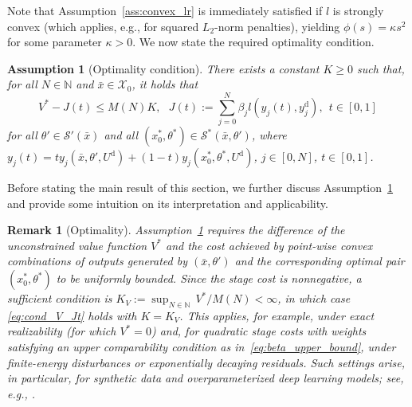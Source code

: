 \documentclass[a4paper,fleqn]{cas-dc}
\newtheorem{ass}{Assumption}
\newtheorem{rem}{Remark}
\begin{document}
Note that Assumption~\ref{ass:convex_lr} is immediately satisfied if $l$ is strongly convex (which applies, e.g., for squared $L_2$-norm penalties), yielding $\phi(s)={\kappa}s^2$ for some parameter $\kappa>0$.
We now state the required optimality condition.

\begin{ass}[Optimality condition]\label{ass:optimality}
	There exists a constant $K\geq0$ such that, for all $N\in\mathbb{N}$ and $\bar{x}\in\mathcal{X}_0$, it holds that
	\begin{equation}\label{eq:cond_V_Jt}
		V^* - J(t) \leq M(N)K, \ \ \ J(t) := \sum_{j=0}^N\beta_jl(y_j(t),y^\mathrm{d}_j), \ \ t\in[0,1]
	\end{equation}
	for all $\theta'\in\mathcal{S}'(\bar{x})$ and all $(x_0^*,\theta^*)\in\mathcal{S}^*(\bar{x},\theta')$, where $y_j(t) = ty_j(\bar{x},\theta',U^\mathrm{d}) + (1-t)y_j(x_0^*,\theta^*,U^\mathrm{d})$, $j\in[0,N]$, $t\in[0,1]$.
\end{ass}

Before stating the main result of this section, we further discuss Assumption~\ref{ass:optimality} and provide some intuition on its interpretation and applicability.

\begin{rem}[Optimality]\label{rem:optimality}
	Assumption~\ref{ass:optimality} requires the difference of the unconstrained value function $V^*$ and the cost achieved by point-wise convex combinations of outputs generated by $(\bar{x},\theta')$ and the corresponding optimal pair $(x_0^*,\theta^*)$ to be uniformly bounded. Since the stage cost is nonnegative, a sufficient condition is $K_V:=\sup_{N\in\mathbb{N}}\,{V^*}/{M(N)} < \infty$, in which case \eqref{eq:cond_V_Jt} holds with $K=K_V$.
	This applies, for example, under exact realizability (for which \(V^*=0\)) and, for quadratic stage costs with weights satisfying an upper comparability condition as in~\eqref{eq:beta_upper_bound}, under finite-energy disturbances or exponentially decaying residuals.
	Such settings arise, in particular, for synthetic data and overparameterized deep learning models; see, e.g., \cite{Mhaskar2020}.
\end{rem}
\end{document}
